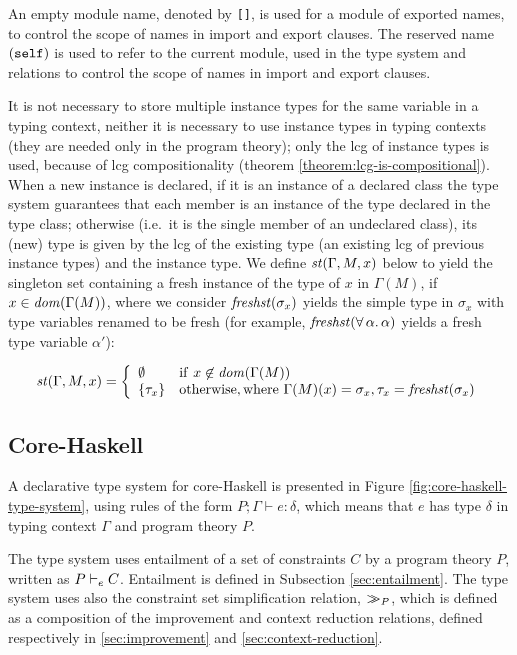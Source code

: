 An empty module name, denoted by {\tt []}, is used for a module of
exported names, to control the scope of names in import and export
clauses. The reserved name $(\mathtt{self})$ is used to refer to the current
module, used in the type system and relations to control the scope of
names in import and export clauses.

It is not necessary to store multiple instance types for the same
variable in a typing context, neither it is necessary to use instance
types in typing contexts (they are needed only in the program theory);
only the lcg of instance types is used, because of lcg
compositionality (theorem \ref{theorem:lcg-is-compositional}). When a
new instance is declared, if it is an instance of a declared class the
type system guarantees that each member is an instance of the type
declared in the type class; otherwise (i.e.~it is the single member of
an undeclared class), its (new) type is given by the lcg of the
existing type (an existing lcg of previous instance types) and the
instance type. We define $\mathit{st\/}(\Gamma,M,x)$ below to yield the
singleton set containing a fresh instance of the type of $x$ in
$\Gamma(M)$, if $x \in \mathit{dom\/}(\Gamma(M))$, where we consider
$\mathit{freshst\/}(\sigma_x)$ yields the simple type in $\sigma_x$ with type
variables renamed to be fresh (for example,
$\mathit{freshst\/}(\forall\,\alpha.\,\alpha)$ yields a fresh type variable
$\alpha'$):

\[ \mathit{st\/}(\Gamma,M,x) = \left\{ \begin{array}{ll}
      \emptyset & \mathrm{if\ } x \not\in \mathit{dom\/}(\Gamma(M)) \\
      \{ \tau_x \} &  \mathrm{otherwise, where\ } \Gamma(M)(x) = \sigma_x, 
      \tau_x = \mathit{freshst\/}(\sigma_x)
\end{array}\right.
\]

\subsection{Core-Haskell}
\label{sec:core-Haskell}

A declarative type system for core-Haskell is presented in Figure
\ref{fig:core-haskell-type-system}, using rules of the form $P;\Gamma
\vdash e:\delta$, which means that $e$ has type $\delta$ in typing
context $\Gamma$ and program theory $P$. 

The type system uses entailment of a set of constraints $C$ by a
program theory $P$, written as $P \vdash_e C$. Entailment is defined in
Subsection \ref{sec:entailment}.
The type system uses also the constraint set simplification relation,
$>\!\!\!>_{P}$, which is defined as a composition of the improvement
and context reduction relations, defined respectively in
\ref{sec:improvement} and \ref{sec:context-reduction}.

